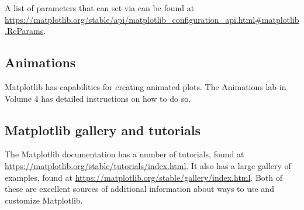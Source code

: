 A list of parameters that can set via  can be found at \url{https://matplotlib.org/stable/api/matplotlib_configuration_api.html#matplotlib.RcParams}.

\subsection*{Animations}
Matplotlib has capabilities for creating animated plots.
The Animations lab in Volume 4 has detailed instructions on how to do so.

\subsection*{Matplotlib gallery and tutorials}
The Matplotlib documentation has a number of tutorials, found at \url{https://matplotlib.org/stable/tutorials/index.html}.
It also has a large gallery of examples, found at \url{https://matplotlib.org/stable/gallery/index.html}.
Both of these are excellent sources of additional information about ways to use and customize Matplotlib.


